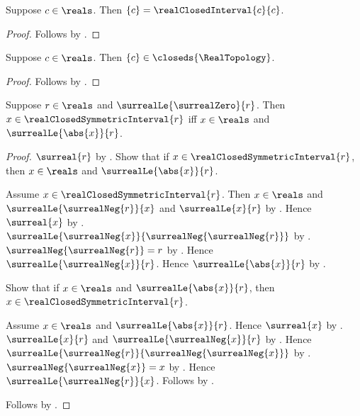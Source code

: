 \begin{proposition}\label{real_singleton_eq_closed_interval}
    Suppose $c\in\reals$.
    Then $\{c\}=\realClosedInterval{c}{c}$.
\end{proposition}
\begin{proof}
    Follows by
        .
\end{proof}

\begin{theorem}\label{real_singleton_is_closed}
    Suppose $c\in\reals$.
    Then $\{c\}\in\closeds{\RealTopology}$.
\end{theorem}
\begin{proof}
    Follows by
        .
\end{proof}

\begin{proposition}\label{real_closed_symmetric_interval_iff_abs_bound}
    Suppose $r\in\reals$ and $\surrealLe{\surrealZero}{r}$.
    Then $x\in\realClosedSymmetricInterval{r}$ iff
        $x\in\reals$ and $\surrealLe{\abs{x}}{r}$.
\end{proposition}
\begin{proof}
    $\surreal{r}$ by .
    Show that if $x\in\realClosedSymmetricInterval{r}$, then
        $x\in\reals$ and $\surrealLe{\abs{x}}{r}$.
    \begin{subproof}
        Assume $x\in\realClosedSymmetricInterval{r}$.
        Then $x\in\reals$ and $\surrealLe{\surrealNeg{r}}{x}$ and
            $\surrealLe{x}{r}$
            by
            .
        Hence $\surreal{x}$ by .
            $\surrealLe{\surrealNeg{x}}
                {\surrealNeg{\surrealNeg{r}}}$
            by
            .
        $\surrealNeg{\surrealNeg{r}}=r$
            by .
        Hence $\surrealLe{\surrealNeg{x}}{r}$.
        Hence $\surrealLe{\abs{x}}{r}$
            by .
    \end{subproof}
    Show that if $x\in\reals$ and $\surrealLe{\abs{x}}{r}$, then
        $x\in\realClosedSymmetricInterval{r}$.
    \begin{subproof}
        Assume $x\in\reals$ and $\surrealLe{\abs{x}}{r}$.
        Hence $\surreal{x}$ by .
        $\surrealLe{x}{r}$ and $\surrealLe{\surrealNeg{x}}{r}$
            by .
        Hence
            $\surrealLe{\surrealNeg{r}}{\surrealNeg{\surrealNeg{x}}}$
            by
            .
        $\surrealNeg{\surrealNeg{x}}=x$
            by .
        Hence $\surrealLe{\surrealNeg{r}}{x}$.
        Follows by
            .
    \end{subproof}
    Follows by \auto.
\end{proof}

